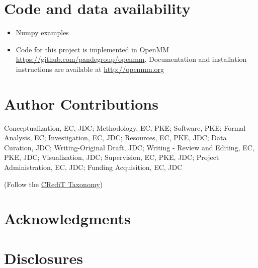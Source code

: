 \documentclass[9pt,lineno]{elife}
\begin{document}
\section{Code and data availability}

\begin{itemize}
\item Numpy examples
\item Code for this project is implemented in OpenMM \href{https://github.com/pandegroup/openmm}{https://github.com/pandegroup/openmm}. Documentation and installation instructions are available at \url{http://openmm.org}
\end{itemize}

\section{Author Contributions}

Conceptualization, EC, JDC; 
Methodology, EC, PKE; 
Software, PKE; 
Formal Analysis, EC; 
Investigation, EC, JDC; 
Resources, EC, PKE, JDC;  
Data Curation, JDC; 
Writing-Original Draft, JDC; 
Writing - Review and Editing, EC, PKE, JDC; 
Visualization, JDC; 
Supervision, EC, PKE, JDC; 
Project Administration, EC, JDC; 
Funding Acquisition, EC, JDC

(Follow the \href{http://www.cell.com/pb/assets/raw/shared/guidelines/CRediT-taxonomy.pdf}{CRediT Taxonomy})

\section{Acknowledgments}


\section{Disclosures}
\end{document}
